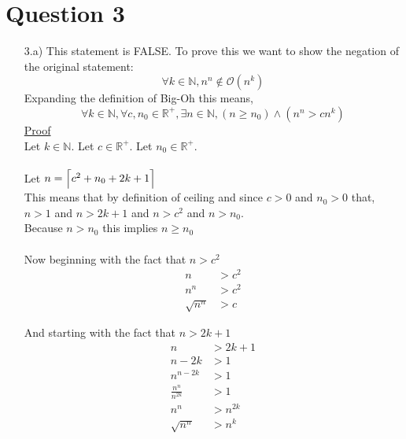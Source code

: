 \documentclass[20pt]{article}
\DeclarePairedDelimiter{\ceil}{\lceil}{\rceil}
\begin{document}
\section*{Question 3}
\begin{enumerate}
\item[3.a)] This statement is FALSE. To prove this we want to show the negation of the original statement: 
\[\forall k \in \mathbb{N}, n^n \notin \mathcal O (n^k)\]
Expanding the definition of Big-Oh this means, 
\[\forall k \in \mathbb{N}, \forall c, n_0 \in \mathbb{R}^+, \exists n \in \mathbb{N}, (n \geq n_0) \wedge  (n^n > cn^k)\]
\underline{Proof}\\
Let $k \in \mathbb{N}.$
Let $c \in \mathbb{R}^+.$ Let $n_0 \in \mathbb{R}^+.$\\\\
Let $n = \ceil[\Big]{c^2 + n_0 + 2k + 1}$\\
This means that by definition of ceiling and since $c > 0$ and $n_0 > 0$ that, \\
$n > 1$ and $n > 2k + 1$ and $n > c^2$ and $n > n_0$.\\
Because $ n > n_0$ this implies $n \geq n_0$\\\\
Now beginning with the fact that $n > c^2$
\begin{align*}
    n &> c^2 \\
    n^n &> c^2 \tag{since $n > 1$} \\
    \sqrt{n^n} &> c \tag{Expression 1} 
\end{align*}

And starting with the fact that $n > 2k +1$
\begin{align*}
    n &> 2k + 1 \\
    n - 2k &>  1 \\
    n^{n-2k} &> 1 \tag{since $n > 1$ and $n - 2k >1$}\\ 
    \frac{n^n}{n^{2k}} &> 1 \\
    n^n &> n^{2k} \\
    \sqrt{n^n} &> n^k \tag{Expression 2}
\end{align*}


\end{enumerate}
\end{document}
